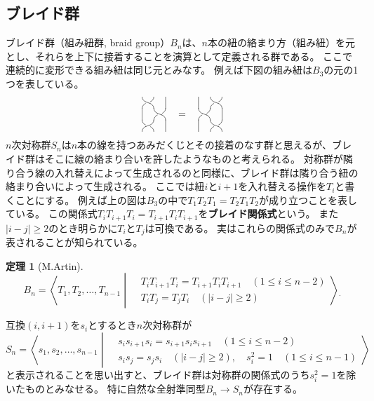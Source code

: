 \documentclass[uplatex,11pt,a4paper,dvipdfmx]{jsarticle}
\numberwithin{equation}{section}
\numberwithin{figure}{section}
\theoremstyle{definition}
\newtheorem{theorem}{定理}[section]
\begin{document}
\subsection{ブレイド群}
ブレイド群（組み紐群, braid group）$B_n$は、$n$本の紐の絡まり方（組み紐）を元とし、それらを上下に接着することを演算として定義される群である。
ここで連続的に変形できる組み紐は同じ元とみなす。
例えば下図の組み紐は$B_3$の元の1つを表している。
\[
    \vcenter{\xy 0;/r1pc/:
    @={(0.5,-0.5),(0,0)}, @@{*{\vtwistneg}},(0,-2),\vtwist,
    @i@={(0,-1),(2,0),(2,-2)} @@{="save";"save"-(0,1),**@{-}}\endxy}
    \quad = \quad
    \vcenter{\xy 0;/r1pc/:
    @={(0.5,0),(0,-0.5),(0.5,-1)}, @@{*{\vtwistneg}},
    @i@={(0,0),(2,-1),(0,-2)} @@{="save";"save"-(0,1),**@{-}}\endxy}
\]
$n$次対称群$S_n$は$n$本の線を持つあみだくじとその接着のなす群と思えるが、ブレイド群はそこに線の絡まり合いを許したようなものと考えられる。
対称群が隣り合う線の入れ替えによって生成されるのと同様に、ブレイド群は隣り合う紐の絡まり合いによって生成される。
ここでは紐$i$と$i+1$を入れ替える操作を$T_i$と書くことにする。
例えば上の図は$B_3$の中で$T_1T_2T_1 = T_2T_1T_2$が成り立つことを表している。
この関係式$T_iT_{i+1}T_i = T_{i+1}T_iT_{i+1}$を\textbf{ブレイド関係式}という。
また$|i-j| \geq 2$のとき明らかに$T_i$と$T_j$は可換である。
実はこれらの関係式のみで$B_n$が表されることが知られている。
\begin{theorem}[M.Artin]\label{thm:braid-group-as-artin-group}
    \begin{equation}
        B_n = \left\langle T_1, T_2, \dots, T_{n-1} \middle| \begin{split}
            &T_iT_{i+1}T_i = T_{i+1}T_iT_{i+1} \quad(1\leq i \leq n-2)\\
            &T_iT_j = T_jT_i\quad (|i-j| \geq 2)
        \end{split}\right\rangle {}_.
    \end{equation}
\end{theorem}
互換$(i, i+1)$を$s_i$とするとき$n$次対称群が
\begin{equation}
    S_n = \left\langle s_1, s_2, \dots, s_{n-1} \middle| \begin{split}
          &s_is_{i+1}s_i = s_{i+1}s_is_{i+1} \quad(1\leq i \leq n-2)\\
          &s_is_j = s_js_i\quad (|i-j| \geq 2), \quad s_i^2 = 1 \quad (1 \leq i \leq n-1)
      \end{split}\right\rangle
\end{equation}
と表示されることを思い出すと、ブレイド群は対称群の関係式のうち$s_i^2 = 1$を除いたものとみなせる。
特に自然な全射準同型$B_n \to S_n$が存在する。
\end{document}
